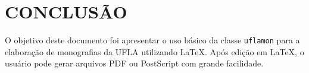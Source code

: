 \chapter{CONCLUSÃO}
\label{cap:conclusao}

O objetivo deste documento foi apresentar o uso básico da classe {\tt uflamon} para a elaboração de monografias da UFLA utilizando \LaTeX. Após edição em \LaTeX, o usuário pode gerar arquivos PDF \cite{PDF2004} ou PostScript \cite{PostScript1999} com grande facilidade.

